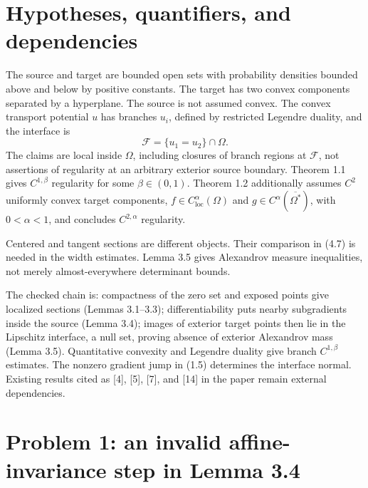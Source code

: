 \documentclass[10pt]{article}
\begin{document}
\section*{Hypotheses, quantifiers, and dependencies}
The source and target are bounded open sets with probability densities bounded above and below by positive constants. The target has two convex components separated by a hyperplane. The source is not assumed convex. The convex transport potential \(u\) has branches \(u_i\), defined by restricted Legendre duality, and the interface is \[{\mathcal{F}}=\{u_1=u_2\}\cap\Omega .\] The claims are local inside \(\Omega\), including closures of branch regions at \(\mathcal F\), not assertions of regularity at an arbitrary exterior source boundary. Theorem 1.1 gives \(C^{1,\beta}\) regularity for some \(\beta\in(0,1)\). Theorem 1.2 additionally assumes \(C^2\) uniformly convex target components, \(f\in C^\alpha_{\mathrm{loc}}(\Omega)\) and \(g\in C^\alpha(\overline{\Omega^*})\), with \(0<\alpha<1\), and concludes \(C^{2,\alpha}\) regularity.\par
Centered and tangent sections are different objects. Their comparison in (4.7) is needed in the width estimates. Lemma 3.5 gives Alexandrov measure inequalities, not merely almost-everywhere determinant bounds.\par
The checked chain is: compactness of the zero set and exposed points give localized sections (Lemmas 3.1–3.3); differentiability puts nearby subgradients inside the source (Lemma 3.4); images of exterior target points then lie in the Lipschitz interface, a null set, proving absence of exterior Alexandrov mass (Lemma 3.5). Quantitative convexity and Legendre duality give branch \(C^{1,\beta}\) estimates. The nonzero gradient jump in (1.5) determines the interface normal. Existing results cited as [4], [5], [7], and [14] in the paper remain external dependencies.\par
\section*{Problem 1: an invalid affine-invariance step in Lemma 3.4}
\end{document}
